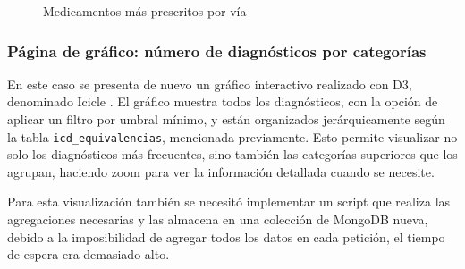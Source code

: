 \begin{figure}[H]
  \centering
  \caption{Medicamentos más prescritos por vía}
  \label{fig:chart-sunburst}
\end{figure}




\subsubsection{Página de gráfico: número de diagnósticos por categorías}

En este caso se presenta de nuevo un gráfico interactivo realizado con D3, denominado Icicle \cite{icicle}. El gráfico muestra todos los diagnósticos, con la opción de aplicar un filtro por umbral mínimo, y están organizados jerárquicamente según la tabla \texttt{icd\_equivalencias}, mencionada previamente. Esto permite visualizar no solo los diagnósticos más frecuentes, sino también las categorías superiores que los agrupan, haciendo zoom para ver la información detallada cuando se necesite. 

Para esta visualización también se necesitó implementar un script que realiza las agregaciones necesarias y las almacena en una colección de MongoDB nueva, debido a la imposibilidad de agregar todos los datos en cada petición, el tiempo de espera era demasiado alto.

